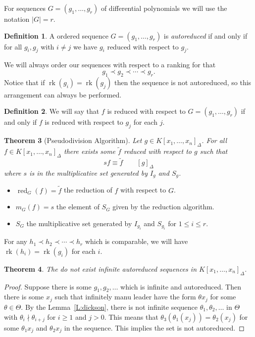\documentclass[12pt]{book}
\numberwithin{equation}{section}
\newtheorem{theorem}{Theorem}[subsection]
\theoremstyle{definition}
\newtheorem{definition}[theorem]{Definition}
\theoremstyle{remark}
\newcommand{\red}{\operatorname{red}}
\newcommand{\rk}{\operatorname{rk}}
\begin{document}
For sequences $G=(g_1,\ldots,g_r)$ of differential polynomials we will use the notation $\vert G \vert = r$.

\begin{definition}
	A ordered sequence $G=(g_1,\ldots,g_r)$ is \emph{autoreduced} if and only if for all $g_i,g_j$ with $i\neq j$ we have $g_i$ reduced with respect to $g_j$. 
\end{definition}

We will always order our sequences with respect to a ranking for that 
$$g_1 \prec g_2 \prec \cdots \prec g_r.$$
Notice that if $\rk(g_i)=\rk(g_j)$ then the sequence is not autoreduced, so this arrangement can always be performed. 

\begin{definition}
	We will say that $f$ is reduced with respect to $G=(g_1,\ldots,g_r)$ if and only if $f$ is reduced with respect to $g_j$ for each $j$.
\end{definition}

\begin{theorem}[Pseudodivision Algorithm]\label{T:pde-pseudodivision}
	Let $g \in K[x_1,\ldots,x_n]_{\Delta}$. 
	For all $f \in K[x_1,\ldots,x_n]_{\Delta}$ there exists some $\widetilde{f}$ reduced with respect to $g$ such that
	$$ s f \equiv \widetilde{f} \qquad [g]_{\Delta} $$
	where $s$ is in the multiplicative set generated by $I_g$ and $S_g$.
\end{theorem}

\begin{itemize}
	\item $\red_G(f) = \widetilde{f}$ the reduction of $f$ with respect to $G$.
	\item $m_G(f)=s$ the element of $S_G$ given by the reduction algorithm.
	\item  $S_G$ the multiplicative set generated by $I_{g_i}$ and $S_{g_i}$ for $1\leq i \leq r$.
\end{itemize}

For any $h_1 \prec h_2 \prec \cdots \prec h_r$ which is comparable, we will have $\rk(h_i) = \rk(g_i)$ for each $i$. 

\begin{theorem}
	The do not exist infinite autoreduced sequences in $K[x_1,\ldots,x_n]_{\Delta}$. 
\end{theorem}
\begin{proof}
	Suppose there is some $g_1,g_2,\ldots$ which is infinite and autoreduced. 
	Then there is some $x_j$ such that infinitely manu leader have the form $\theta x_j$ for some $\theta \in \Theta$. 
	By the Lemma~\ref{L:dickson}, there is not infinite sequence $\theta_1,\theta_2,\ldots$ in $\Theta$ with $\theta_i \nmid \theta_{i+j}$ for $i\geq 1$ and $j>0$. 
	This means that $\theta_{3}(\theta_1(x_j))=\theta_2(x_j)$ for some $\theta_1 x_j$ and $\theta_2 x_j$ in the sequence. 
	This implies the set is not autoreduced.
\end{proof}
\end{document}
